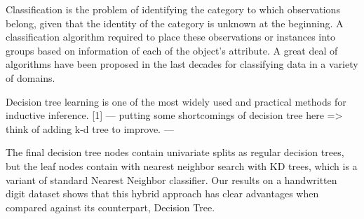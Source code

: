 Classification is the problem of identifying the category to which observations belong, given that the identity of the category is unknown at the beginning. A classification algorithm required to place these observations or instances into groups based on information of each of the object’s attribute. A great deal of algorithms have been proposed in the last decades for classifying data in a variety of domains.

	Decision tree learning is one of the most widely used and practical methods for inductive inference. [1] --- putting some shortcomings of decision tree here => think of adding k-d tree to improve. ---

	The final decision tree nodes contain univariate splits as regular decision trees, but the leaf nodes contain with nearest neighbor search with KD trees, which is a variant of standard Nearest Neighbor classifier. Our results on a handwritten digit dataset shows that this hybrid approach has clear advantages when compared against its counterpart, Decision Tree.


